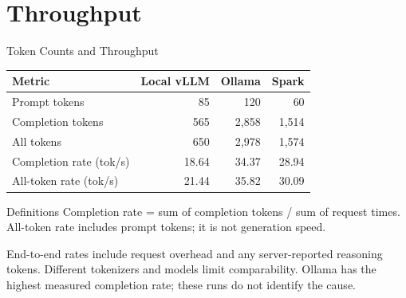 \documentclass[aspectratio=169,12pt]{beamer}
\begin{document}
\section{Throughput}
\begin{frame}{Token Counts and Throughput}
\centering
\small
\begin{tabular}{lrrr}
\toprule
Metric & Local vLLM & Ollama & Spark \\
\midrule
Prompt tokens & 85 & 120 & 60 \\
Completion tokens & 565 & 2,858 & 1,514 \\
All tokens & 650 & 2,978 & 1,574 \\
Completion rate (tok/s) & 18.64 & 34.37 & 28.94 \\
All-token rate (tok/s) & 21.44 & 35.82 & 30.09 \\

\bottomrule
\end{tabular}
\begin{block}{Definitions}
Completion rate = sum of completion tokens / sum of request times.\\
All-token rate includes prompt tokens; it is not generation speed.
\end{block}
\footnotesize End-to-end rates include request overhead and any server-reported reasoning tokens. Different tokenizers and models limit comparability. Ollama has the highest measured completion rate; these runs do not identify the cause.
\end{frame}
\end{document}

